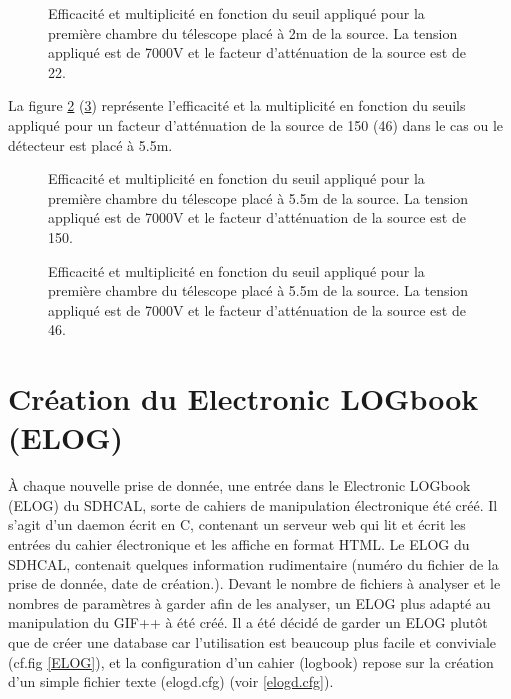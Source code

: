 \begin{figure}[ht!]
	\centering
	\hfill
	\caption{Efficacité et multiplicité en fonction du seuil appliqué pour la première chambre du télescope placé à 2m de la source. La tension appliqué est de 7000V et le facteur d'atténuation de la source est de 22.}
	\label{att22}
\end{figure}

La figure \ref{att150} (\ref{att46}) représente l'efficacité et la multiplicité en fonction du seuils appliqué pour un facteur d'atténuation de la source de 150 (46) dans le cas ou le détecteur est placé à 5.5m.

\begin{figure}[ht!]
	\centering
	\hfill
	\caption{Efficacité et multiplicité en fonction du seuil appliqué pour la première chambre du télescope placé à 5.5m de la source. La tension appliqué est de 7000V et le facteur d'atténuation de la source est de 150.}
	\label{att150}
\end{figure}

\begin{figure}[ht!]
	\centering
	\hfill
	\caption{Efficacité et multiplicité en fonction du seuil appliqué pour la première chambre du télescope placé à 5.5m de la source. La tension appliqué est de 7000V et le facteur d'atténuation de la source est de 46.}
	\label{att46}
\end{figure}


\section{Création du Electronic LOGbook (ELOG)}
À chaque nouvelle prise de donnée, une entrée dans le Electronic LOGbook (ELOG) \cite{ELOG} du SDHCAL, sorte de cahiers de manipulation électronique été créé. Il s'agit d'un daemon écrit en C, contenant un serveur web qui lit et écrit les entrées du cahier électronique et les affiche en format HTML. Le ELOG du SDHCAL, contenait quelques information rudimentaire (numéro du fichier de la prise de donnée, date de création.). Devant le nombre de fichiers à analyser et le nombres de paramètres à garder afin de les analyser, un ELOG plus adapté au manipulation du GIF++ à été créé. Il a été décidé de garder un ELOG plutôt que de créer une database car l'utilisation est beaucoup plus facile et conviviale (cf.fig \ref{ELOG}), et la configuration d'un cahier (logbook) repose sur la création d'un simple fichier texte (elogd.cfg) (voir \ref{elogd.cfg}). 

